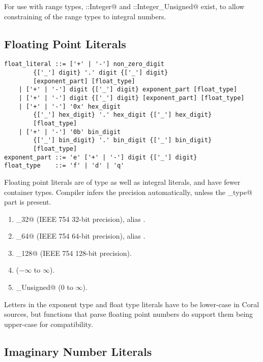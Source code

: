 For use with range types, \lstinline@Number::Integer@ and \lstinline@Number::Integer_Unsigned@ exist, to allow constraining of the range types to integral numbers.

\subsection{Floating Point Literals}\label{sec:floatliterals}

\syntax\begin{lstlisting}
float_literal ::= ['+' | '-'] non_zero_digit 
		{['_'] digit} '.' digit {['_'] digit}
		[exponent_part] [float_type]
	| ['+' | '-'] digit {['_'] digit} exponent_part [float_type]
	| ['+' | '-'] digit {['_'] digit} [exponent_part] [float_type]
	| ['+' | '-'] '0x' hex_digit
		{['_'] hex_digit} '.' hex_digit {['_'] hex_digit}
		[float_type]
	| ['+' | '-'] '0b' bin_digit
		{['_'] bin_digit} '.' bin_digit {['_'] bin_digit}
		[float_type]
exponent_part ::= 'e' ['+' | '-'] digit {['_'] digit}
float_type    ::= 'f' | 'd' | 'q'
\end{lstlisting}

Floating point literals are of type \lstinline@Number@ as well as integral literals, and have fewer container types. Compiler infers the precision automatically, unless the \lstinline@float_type@ part is present. 

\begin{enumerate}

\item \lstinline@Float_32@ (IEEE 754 32-bit precision), alias \lstinline@Float@. 

\item \lstinline@Float_64@ (IEEE 754 64-bit precision), alias \lstinline@Double@.

\item \lstinline@Float_128@ (IEEE 754 128-bit precision).

\item \lstinline@Decimal@ ($-\infty$ to $\infty$).

\item \lstinline@Decimal_Unsigned@ ($0$ to $\infty$).

\end{enumerate}

Letters in the exponent type and float type literals have to be lower-case in Coral sources, but functions that parse floating point numbers do support them being upper-case for compatibility. 

\subsection{Imaginary Number Literals}\label{sec:imaginaryliterals}

